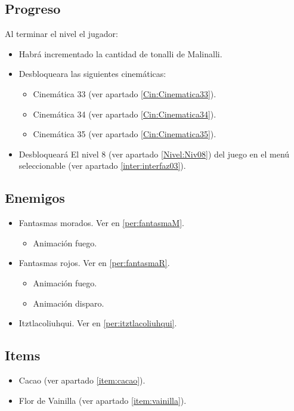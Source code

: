 	\subsection{Progreso}
	Al terminar el nivel el jugador:
\begin{itemize}
        \item Habrá incrementado la cantidad de tonalli de Malinalli. 
        \item Desbloqueara las siguientes cinemáticas:
\begin{itemize}
        \item Cinemática 33 (ver apartado \ref{Cin:Cinematica33}). 
        \item Cinemática 34 (ver apartado \ref{Cin:Cinematica34}).
        \item Cinemática 35 (ver apartado \ref{Cin:Cinematica35}).
\end{itemize}
        \item Desbloqueará El nivel 8 (ver apartado  \ref{Nivel:Niv08}) del juego en el menú seleccionable (ver apartado \ref{inter:interfaz03}).
\end{itemize} 
	\subsection{Enemigos}
	\begin{itemize}
		\item Fantasmas morados. Ver en \ref{per:fantasmaM}.
			\begin{itemize}
				\item Animación fuego.
			\end{itemize}
		\item Fantasmas rojos. Ver en \ref{per:fantasmaR}.
		\begin{itemize}
				\item Animación fuego.
				\item Animación disparo.
			\end{itemize}
		\item Itztlacoliuhqui. Ver en \ref{per:itztlacoliuhqui}.
	\end{itemize}
	\subsection{Items}
\begin{itemize}
        \item   Cacao (ver apartado \ref{item:cacao}).
        \item Flor de Vainilla (ver apartado \ref{item:vainilla}).
\end{itemize}
